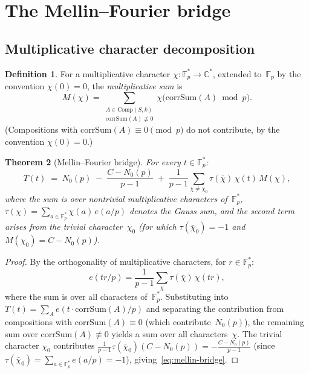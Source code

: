 \documentclass[12pt, a4paper]{amsart}
\theoremstyle{plain}
\newtheorem{theorem}{Theorem}[section]
\theoremstyle{definition}
\newtheorem{definition}[theorem]{Definition}
\theoremstyle{remark}
\newcommand{\Fp}{\mathbb{F}_p}
\newcommand{\Comp}{\mathrm{Comp}}
\newcommand{\corrSum}{\mathrm{corrSum}}
\begin{document}
\section{The Mellin--Fourier bridge}\label{sec:mellin}

\subsection{Multiplicative character decomposition}

\begin{definition}\label{def:M-chi}
  For a multiplicative character
  $\chi \colon \Fp^* \to \mathbb{C}^*$, extended to~$\Fp$ by
  the convention $\chi(0) = 0$, the \emph{multiplicative
  sum} is
  \[
    M(\chi) = \sum_{\substack{A \in \Comp(S,k)\\
    \corrSum(A) \not\equiv 0}}
    \chi\bigl(\corrSum(A) \bmod p\bigr).
  \]
  (Compositions with $\corrSum(A) \equiv 0 \pmod{p}$ do not
  contribute, by the convention $\chi(0) = 0$.)
\end{definition}

\begin{theorem}[Mellin--Fourier bridge]\label{thm:mellin-bridge}
  For every $t \in \Fp^*$:
  \begin{equation}\label{eq:mellin-bridge}
    T(t) \;=\; N_0(p) \;-\; \frac{C - N_0(p)}{p-1}
    \;+\; \frac{1}{p-1}\sum_{\chi \neq \chi_0}
    \tau(\bar{\chi})\,\chi(t)\,M(\chi),
  \end{equation}
  where the sum is over nontrivial multiplicative characters
  of~$\Fp^*$, $\tau(\chi) = \sum_{a \in \Fp^*} \chi(a)\,e(a/p)$
  denotes the Gauss sum, and the second term arises from
  the trivial character~$\chi_0$ (for which
  $\tau(\bar{\chi}_0) = -1$ and $M(\chi_0) = C - N_0(p)$).
\end{theorem}

\begin{proof}
  By the orthogonality of multiplicative characters, for
  $r \in \Fp^*$:
  \[
    e(tr/p) = \frac{1}{p-1}\sum_\chi
    \tau(\bar\chi)\,\chi(tr),
  \]
  where the sum is over all characters of~$\Fp^*$.
  Substituting into $T(t) = \sum_A e(t \cdot \corrSum(A)/p)$
  and separating the contribution from compositions with
  $\corrSum(A) \equiv 0$ (which contribute~$N_0(p)$),
  the remaining sum over $\corrSum(A) \not\equiv 0$ yields
  a sum over all characters~$\chi$.  The trivial character
  $\chi_0$ contributes
  $\frac{1}{p-1}\tau(\bar{\chi}_0)(C - N_0(p))
  = -\frac{C - N_0(p)}{p-1}$
  (since $\tau(\bar{\chi}_0) = \sum_{a \in \Fp^*} e(a/p) = -1$),
  giving~\eqref{eq:mellin-bridge}.
\end{proof}
\end{document}
